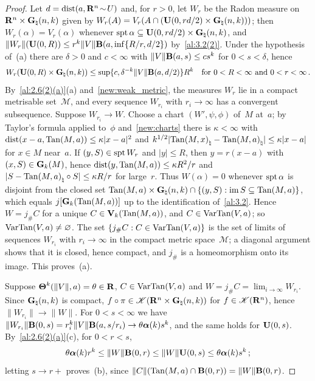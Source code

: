 \begin{proof}
    Let $d = \operatorname{dist}(a, \mathbf{R}^{n} \!\sim\! U)$ and, for $r > 0$, let $W_r$ be the Radon measure on
    $\mathbf{R}^{n} \times \mathbf{G}_{\natural}(n,k)$ given by $W_r(A) = V_r(A \cap (\mathbf{U}(0,rd/2)
    \times \mathbf{G}_{\natural}(n,k)))$; then $W_r(\alpha) = V_r(\alpha)$ whenever $\operatorname{spt} \alpha
    \subseteq \mathbf{U}(0,rd/2) \times \mathbf{G}_{\natural}(n,k)$, and $\|W_r\|(\mathbf{U}(0,R)) \le
    r^{k} \|V\| \mathbf{B}(a,\inf\{R/r, d/2\})$ by~\ref{al:3.2(2)}. Under the hypothesis of~(a)
    there are $\delta > 0$ and $c < \infty$ with $\|V\| \mathbf{B}(a,s) \le c s^{k}$ for $0 < s <
    \delta$, hence
    \begin{displaymath}
        W_r(\mathbf{U}(0,R) \times \mathbf{G}_{\natural}(n,k)) \le \sup \{ c, \delta^{-k} \|V\|
        \mathbf{B}(a,d/2) \} R^{k} \quad \text{for $0 < R < \infty$ and $0 < r < \infty$} \,.
    \end{displaymath}
    By~\ref{al:2.6(2)(a)}(a) and~\ref{new:weak_metric}, the measures $W_r$ lie in a compact
    metrisable set~$\mathcal{M}$, and every sequence $W_{r_i}$ with $r_i \to \infty$ has a
    convergent subsequence. Suppose $W_{r_i} \to W$. Choose a chart $(W',\psi,\phi)$ of~$M$
    at~$a$; by Taylor's formula applied to~$\phi$ and~\ref{new:charts} there is $\kappa < \infty$ with $\operatorname{dist}(x - a, \operatorname{Tan}(M,a)) \le
    \kappa |x - a|^2$ and $k^{1/2} |{\operatorname{Tan}(M,x)}_\natural - {\operatorname{Tan}(M,a)}_\natural| \le \kappa |x -
    a|$ for $x \in M$ near~$a$. If $(y,S) \in \operatorname{spt} W_r$ and $|y| \le R$, then $y = r(x-a)$ with
    $(x,S) \in \mathbf{G}_{k}(M)$, hence $\operatorname{dist}(y, \operatorname{Tan}(M,a)) \le \kappa R^2 / r$ and $|S -
    {\operatorname{Tan}(M,a)}_\natural \circ S| \le \kappa R / r$ for large~$r$. Thus $W(\alpha) = 0$ whenever
    $\operatorname{spt} \alpha$ is disjoint from the closed set $\operatorname{Tan}(M,a) \times \mathbf{G}_{\natural}(n,k) \cap
    \{ (y,S) : \operatorname{im} S \subseteq \operatorname{Tan}(M,a) \}$, which equals $j[\mathbf{G}_{k}(\operatorname{Tan}(M,a))]$ up to the
    identification of~\ref{al:3.2}. Hence $W = j_\# C$ for a unique $C \in
    \mathbf{V}_{k}(\operatorname{Tan}(M,a))$, and $C \in \operatorname{VarTan}(V,a)$; so $\operatorname{VarTan}(V,a) \ne \varnothing$. The set
    $\{ j_\# C : C \in \operatorname{VarTan}(V,a) \}$ is the set of limits of sequences $W_{r_i}$ with $r_i \to
    \infty$ in the compact metric space~$\mathcal{M}$; a diagonal argument shows that it is
    closed, hence compact, and $j_\#$ is a homeomorphism onto its image. This proves~(a).

    Suppose $\boldsymbol{\Theta}^{k}(\|V\|,a) = \theta \in \mathbf{R}$, $C \in \operatorname{VarTan}(V,a)$ and $W = j_\# C =
    \lim_{i \to \infty} W_{r_i}$. Since $\mathbf{G}_{\natural}(n,k)$ is compact, $f \circ \pi \in
    \mathscr{K}(\mathbf{R}^{n} \times \mathbf{G}_{\natural}(n,k))$ for $f \in \mathscr{K}(\mathbf{R}^{n})$, hence
    $\|W_{r_i}\| \to \|W\|$. For $0 < s < \infty$ we have $\|W_{r_i}\| \mathbf{B}(0,s) = r_i^{k}
    \|V\| \mathbf{B}(a,s/r_i) \to \theta \boldsymbol{\alpha}(k) s^{k}$, and the same holds for
    $\mathbf{U}(0,s)$. By~\ref{al:2.6(2)(a)}(c), for $0 < r < s$,
    \begin{displaymath}
        \theta \boldsymbol{\alpha}(k) r^{k} \le \|W\| \mathbf{B}(0,r) \le \|W\| \mathbf{U}(0,s) \le \theta
        \boldsymbol{\alpha}(k) s^{k} \,;
    \end{displaymath}
    letting $s \to r+$ proves~(b), since $\|C\|(\operatorname{Tan}(M,a) \cap \mathbf{B}(0,r)) = \|W\|
    \mathbf{B}(0,r)$.


\end{proof}
